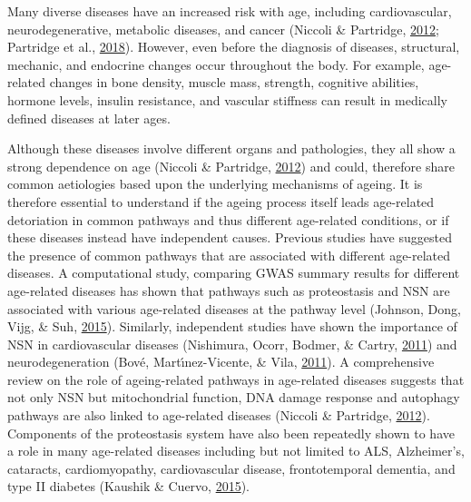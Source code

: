 \documentclass[12pt,twoside]{unicam}
\begin{document}
Many diverse diseases have an increased risk with age, including cardiovascular, neurodegenerative, metabolic diseases, and cancer (Niccoli \& Partridge, \protect\hyperlink{ref-Niccoli2012}{2012}; Partridge et al., \protect\hyperlink{ref-Partridge2018}{2018}). However, even before the diagnosis of diseases, structural, mechanic, and endocrine changes occur throughout the body. For example, age-related changes in bone density, muscle mass, strength, cognitive abilities, hormone levels, insulin resistance, and vascular stiffness can result in medically defined diseases at later ages.

Although these diseases involve different organs and pathologies, they all show a strong dependence on age (Niccoli \& Partridge, \protect\hyperlink{ref-Niccoli2012}{2012}) and could, therefore share common aetiologies based upon the underlying mechanisms of ageing. It is therefore essential to understand if the ageing process itself leads age-related detoriation in common pathways and thus different age-related conditions, or if these diseases instead have independent causes. Previous studies have suggested the presence of common pathways that are associated with different age-related diseases. A computational study, comparing GWAS summary results for different age-related diseases has shown that pathways such as proteostasis and NSN are associated with various age-related diseases at the pathway level (Johnson, Dong, Vijg, \& Suh, \protect\hyperlink{ref-Johnson2015}{2015}). Similarly, independent studies have shown the importance of NSN in cardiovascular diseases (Nishimura, Ocorr, Bodmer, \& Cartry, \protect\hyperlink{ref-Nishimura2011}{2011}) and neurodegeneration (Bové, Martı́nez-Vicente, \& Vila, \protect\hyperlink{ref-Bove2011}{2011}). A comprehensive review on the role of ageing-related pathways in age-related diseases suggests that not only NSN but mitochondrial function, DNA damage response and autophagy pathways are also linked to age-related diseases (Niccoli \& Partridge, \protect\hyperlink{ref-Niccoli2012}{2012}). Components of the proteostasis system have also been repeatedly shown to have a role in many age-related diseases including but not limited to ALS, Alzheimer's, cataracts, cardiomyopathy, cardiovascular disease, frontotemporal dementia, and type II diabetes (Kaushik \& Cuervo, \protect\hyperlink{ref-Kaushik2015}{2015}).
\end{document}
